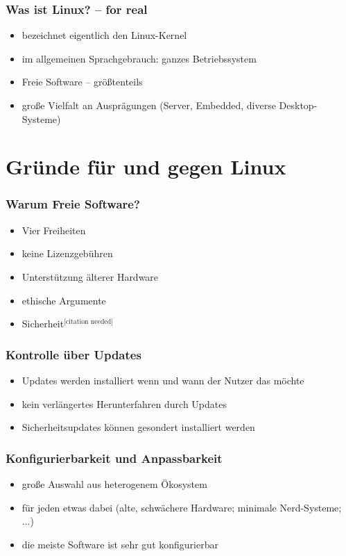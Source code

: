 \documentclass[t]{beamer}
\begin{document}
\begin{frame}
  \frametitle{Was ist Linux? – for real}
  \begin{itemize}
  \item bezeichnet eigentlich den Linux-Kernel
  \item im allgemeinen Sprachgebrauch: ganzes Betriebssystem
  \item Freie Software – größtenteils
  \item große Vielfalt an Ausprägungen (Server, Embedded, diverse
    Desktop-Systeme)
  \end{itemize}
\end{frame}

\section{Gründe für und gegen Linux}
\begin{frame}
  \frametitle{Warum Freie Software?}
  \begin{itemize}
  \item Vier Freiheiten
  \item keine Lizenzgebühren
  \item Unterstützung älterer Hardware
  \item ethische Argumente
  \item Sicherheit${}^\text{[citation needed]}$
  \end{itemize}
\end{frame}

\begin{frame}
  \frametitle{Kontrolle über Updates}
  \begin{itemize}
  \item Updates werden installiert wenn und wann der Nutzer das möchte
  \item kein verlängertes Herunterfahren durch Updates
  \item Sicherheitsupdates können gesondert installiert werden
  \end{itemize}
\end{frame}

\begin{frame}
  \frametitle{Konfigurierbarkeit und Anpassbarkeit}
  \begin{itemize}
  \item große Auswahl aus heterogenem Ökosystem
  \item für jeden etwas dabei (alte, schwächere Hardware; minimale
    Nerd-Systeme; ...)
  \item die meiste Software ist sehr gut konfigurierbar
  \end{itemize}
\end{frame}
\end{document}
